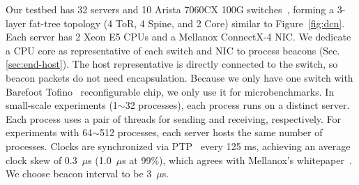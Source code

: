 Our testbed has 32 servers and 10 Arista 7060CX 100G switches~\cite{arista}, forming a 3-layer fat-tree topology (4 ToR, 4 Spine, and 2 Core) similar to Figure~\ref{fig:dcn}.
Each server has 2 Xeon E5 CPUs and a Mellanox ConnectX-4 NIC. %
We dedicate a CPU core as representative of each switch and NIC to process beacons (Sec.\ref{sec:end-host}). The host representative is directly connected to the switch, so beacon packets do not need encapsulation.
Because we only have one switch with Barefoot Tofino~\cite{tofino} reconfigurable chip, we only use it for microbenchmarks.
In small-scale experiments (1$\sim$32 processes), each process runs on a distinct server. Each process uses a pair of threads for sending and receiving, respectively.
For experiments with 64$\sim$512 processes, each server hosts the same number of processes.
Clocks are synchronized via PTP~\cite{correll2005design} every 125 ms, achieving an average clock skew of 0.3~$\mu$s (1.0~$\mu$s at 99\%), which agrees with Mellanox's whitepaper~\cite{mellanox-ptp}.
We choose beacon interval to be 3~$\mu$s.


\iffalse
\begin{table}[t]
\centering
{}
\caption{Network topologies for evaluation.}
\label{tab:eval-topology}
\end{table}

